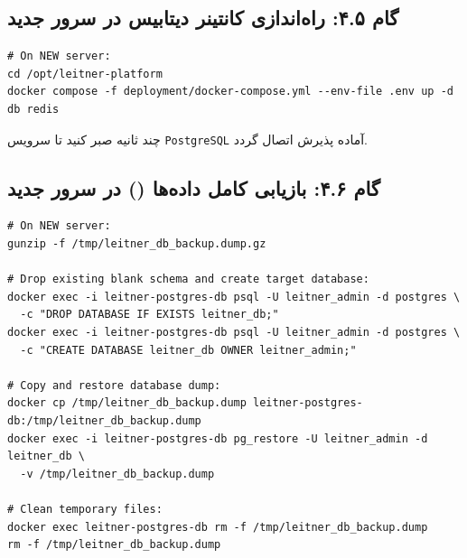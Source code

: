 \documentclass[11pt,a4paper]{article}
\begin{document}
\subsection{گام ۴.۵: راه‌اندازی کانتینر دیتابیس در سرور جدید}
\begin{latin}
\small
\begin{verbatim}
# On NEW server:
cd /opt/leitner-platform
docker compose -f deployment/docker-compose.yml --env-file .env up -d db redis
\end{verbatim}
\end{latin}
چند ثانیه صبر کنید تا سرویس \verb|PostgreSQL| آماده پذیرش اتصال گردد.

\subsection{گام ۴.۶: بازیابی کامل داده‌ها () در سرور جدید}
\begin{latin}
\small
\begin{verbatim}
# On NEW server:
gunzip -f /tmp/leitner_db_backup.dump.gz

# Drop existing blank schema and create target database:
docker exec -i leitner-postgres-db psql -U leitner_admin -d postgres \
  -c "DROP DATABASE IF EXISTS leitner_db;"
docker exec -i leitner-postgres-db psql -U leitner_admin -d postgres \
  -c "CREATE DATABASE leitner_db OWNER leitner_admin;"

# Copy and restore database dump:
docker cp /tmp/leitner_db_backup.dump leitner-postgres-db:/tmp/leitner_db_backup.dump
docker exec -i leitner-postgres-db pg_restore -U leitner_admin -d leitner_db \
  -v /tmp/leitner_db_backup.dump

# Clean temporary files:
docker exec leitner-postgres-db rm -f /tmp/leitner_db_backup.dump
rm -f /tmp/leitner_db_backup.dump
\end{verbatim}
\end{latin}

\end{document}
